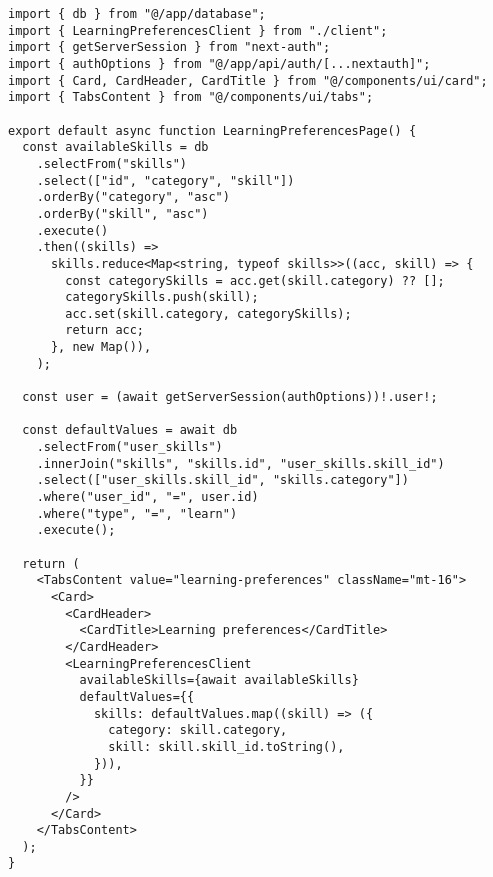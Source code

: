 \begin{verbatim}
import { db } from "@/app/database";
import { LearningPreferencesClient } from "./client";
import { getServerSession } from "next-auth";
import { authOptions } from "@/app/api/auth/[...nextauth]";
import { Card, CardHeader, CardTitle } from "@/components/ui/card";
import { TabsContent } from "@/components/ui/tabs";

export default async function LearningPreferencesPage() {
  const availableSkills = db
    .selectFrom("skills")
    .select(["id", "category", "skill"])
    .orderBy("category", "asc")
    .orderBy("skill", "asc")
    .execute()
    .then((skills) =>
      skills.reduce<Map<string, typeof skills>>((acc, skill) => {
        const categorySkills = acc.get(skill.category) ?? [];
        categorySkills.push(skill);
        acc.set(skill.category, categorySkills);
        return acc;
      }, new Map()),
    );

  const user = (await getServerSession(authOptions))!.user!;

  const defaultValues = await db
    .selectFrom("user_skills")
    .innerJoin("skills", "skills.id", "user_skills.skill_id")
    .select(["user_skills.skill_id", "skills.category"])
    .where("user_id", "=", user.id)
    .where("type", "=", "learn")
    .execute();

  return (
    <TabsContent value="learning-preferences" className="mt-16">
      <Card>
        <CardHeader>
          <CardTitle>Learning preferences</CardTitle>
        </CardHeader>
        <LearningPreferencesClient
          availableSkills={await availableSkills}
          defaultValues={{
            skills: defaultValues.map((skill) => ({
              category: skill.category,
              skill: skill.skill_id.toString(),
            })),
          }}
        />
      </Card>
    </TabsContent>
  );
}
\end{verbatim}

